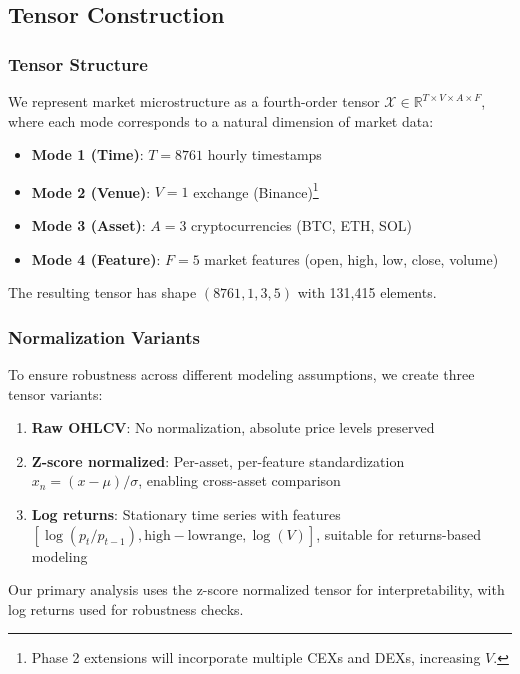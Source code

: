 \documentclass[11pt,twocolumn]{article}
\begin{document}
\subsection{Tensor Construction}

\subsubsection{Tensor Structure}

We represent market microstructure as a fourth-order tensor $\mathcal{X} \in \mathbb{R}^{T \times V \times A \times F}$, where each mode corresponds to a natural dimension of market data:

\begin{itemize}[leftmargin=*]
    \item \textbf{Mode 1 (Time)}: $T = 8761$ hourly timestamps
    \item \textbf{Mode 2 (Venue)}: $V = 1$ exchange (Binance)\footnote{Phase 2 extensions will incorporate multiple CEXs and DEXs, increasing $V$.}
    \item \textbf{Mode 3 (Asset)}: $A = 3$ cryptocurrencies (BTC, ETH, SOL)
    \item \textbf{Mode 4 (Feature)}: $F = 5$ market features (open, high, low, close, volume)
\end{itemize}

The resulting tensor has shape $(8761, 1, 3, 5)$ with 131,415 elements.

\subsubsection{Normalization Variants}

To ensure robustness across different modeling assumptions, we create three tensor variants:

\begin{enumerate}[leftmargin=*]
    \item \textbf{Raw OHLCV}: No normalization, absolute price levels preserved
    \item \textbf{Z-score normalized}: Per-asset, per-feature standardization $x_{n} = (x - \mu) / \sigma$, enabling cross-asset comparison
    \item \textbf{Log returns}: Stationary time series with features $[\log(p_t / p_{t-1}), \mathrm{high-low range}, \log(V)]$, suitable for returns-based modeling
\end{enumerate}

Our primary analysis uses the z-score normalized tensor for interpretability, with log returns used for robustness checks.
\end{document}

